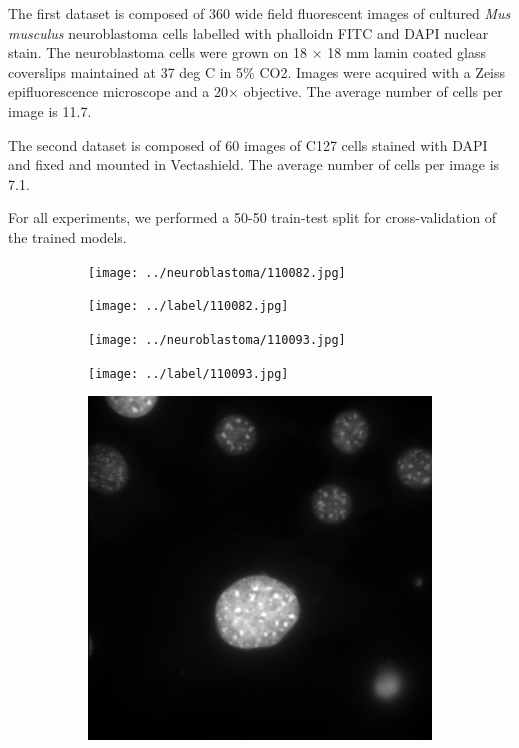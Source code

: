 \documentclass[journal]{IEEEtran}
\begin{document}
The first dataset is composed of 360 wide field fluorescent images of cultured \textit{Mus musculus} neuroblastoma cells labelled with phalloidn FITC and DAPI nuclear stain. The neuroblastoma cells were grown on 18 $\times$ 18 mm lamin coated glass coverslips maintained at 37 deg C in 5\% CO2. Images were acquired with a Zeiss epifluorescence microscope and a 20$\times$ objective. The average number of cells per image is 11.7.

The second dataset is composed of 60 images of C127 cells stained with DAPI and fixed and mounted in Vectashield. The average number of cells per image is 7.1.

For all experiments, we performed a 50-50 train-test split for cross-validation of the trained models.
\begin{figure}
\centering
\begin{subfigure}[b]{0.24\linewidth}
\texttt{[image: ../neuroblastoma/110082.jpg]}
\caption{}
\end{subfigure}
\begin{subfigure}[b]{0.24\linewidth}
\texttt{[image: ../label/110082.jpg]}
\caption{}
\end{subfigure}
\begin{subfigure}[b]{0.24\linewidth}
\texttt{[image: ../neuroblastoma/110093.jpg]}
\caption{}
\end{subfigure}
\begin{subfigure}[b]{0.24\linewidth}
\texttt{[image: ../label/110093.jpg]}
\caption{}
\end{subfigure}
\begin{subfigure}[b]{0.24\linewidth}
\includegraphics[width=\linewidth]{c127/108636.jpg}

\end{subfigure}
\end{figure}
\end{document}
